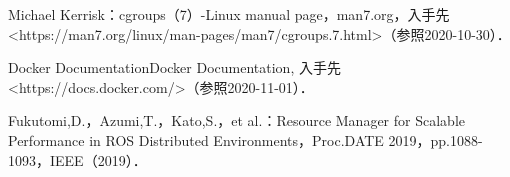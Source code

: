 \documentclass[11pt]{ujarticle} %
\begin{document}
\begin{thebibliography}{99}
  \begin{flushleft}
  Michael Kerrisk：cgroups（7）-Linux manual page，man7.org，入手先\textless https://man7.org/linux/man-pages/man7/cgroups.7.html\textgreater（参照2020-10-30）．
  \end{flushleft}
  \begin{flushleft}
  Docker Documentation\textbar Docker Documentation, 入手先\textless https://docs.docker.com/\textgreater（参照2020-11-01）．\end{flushleft}
  \begin{flushleft}
  Fukutomi,D.，Azumi,T.，Kato,S.，et al.：Resource Manager for Scalable Performance in ROS Distributed Environments，Proc.DATE 2019，pp.1088-1093，IEEE（2019）．
  \end{flushleft}

\end{thebibliography}
\end{document}
